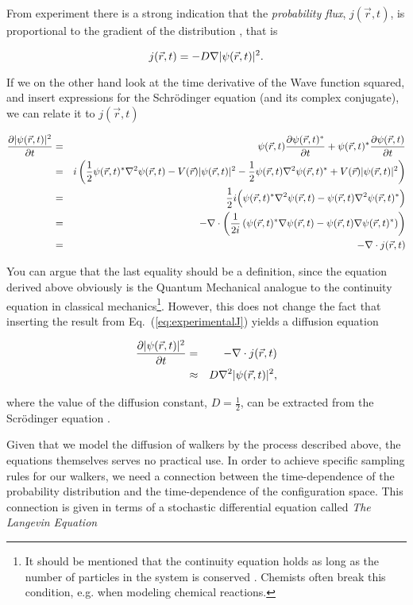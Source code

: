 From experiment there is a strong indication that the \textit{probability flux}, $j(\vec r, t)$, is proportional to the gradient of the distribution \cite{morten}, that is

\begin{equation}
 j(\vec r, t) = -D\nabla|\psi(\vec r, t)|^2.
 \label{eq:experimentalJ}
\end{equation}

If we on the other hand look at the time derivative of the Wave function squared, and insert expressions for the Schr\"odinger equation (and its complex conjugate), we can relate it to $j(\vec r, t)$  

\begin{eqnarray*}
 \frac{\partial |\psi(\vec r, t)|^2}{\partial t} &=& \psi(\vec r, t)\frac{\partial \psi(\vec r, t)^\ast}{\partial t} + \psi(\vec r, t)^\ast\frac{\partial \psi(\vec r, t)}{\partial t} \\
  &=& i\left(\frac{1}{2}\psi(\vec r, t)^\ast\nabla^2\psi(\vec r, t) - V(\vec r)|\psi(\vec r, t)|^2 - \frac{1}{2}\psi(\vec r, t)\nabla^2\psi(\vec r, t)^\ast+ V(\vec r)|\psi(\vec r, t)|^2 \right) \\
  &=& \frac{1}{2}i\Big(\psi(\vec r, t)^\ast\nabla^2\psi(\vec r, t)-\psi(\vec r, t)\nabla^2\psi(\vec r, t)^\ast\Big) \\
  &=& -\nabla\cdot\left(\frac{1}{2i}\left(\psi(\vec r, t)^\ast\nabla\psi(\vec r, t)-\psi(\vec r, t)\nabla\psi(\vec r, t)^\ast\right)\right) \\
  &=& -\nabla\cdot j(\vec r, t)
\end{eqnarray*}

You can argue that the last equality should be a definition, since the equation derived above obviously is the Quantum Mechanical analogue to the continuity equation in classical mechanics\footnote{It should be mentioned that the continuity equation holds as long as the number of particles in the system is conserved \cite{morten}. Chemists often break this condition, e.g. when modeling chemical reactions.}. However, this does not change the fact that inserting the result from Eq.~(\ref{eq:experimentalJ}) yields a diffusion equation

\begin{eqnarray}
 \frac{\partial |\psi(\vec r, t)|^2}{\partial t} &=& -\nabla\cdot j(\vec r, t) \nonumber \\
                                    &\approx& D\nabla^2|\psi(\vec r, t)|^2,
\end{eqnarray}

where the value of the diffusion constant, $D=\frac{1}{2}$, can be extracted from the Scr\"odinger equation \cite{abInitioMC}.

Given that we model the diffusion of walkers by the process described above, the equations themselves serves no practical use. In order to achieve specific sampling rules for our walkers, we need a connection between the time-dependence of the probability distribution and the time-dependence of the configuration space. This connection is given in terms of a stochastic differential equation called \textit{The Langevin Equation}




